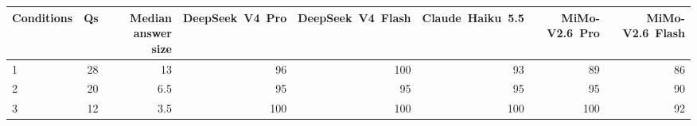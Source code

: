\begin{tabular}{lrrrrrrr}
\toprule
Conditions & Qs & Median answer size & DeepSeek\ V4\ Pro & DeepSeek\ V4\ Flash & Claude\ Haiku\ 5.5 & MiMo-V2.6\ Pro & MiMo-V2.6\ Flash \\
\midrule
1 & 28 & 13 & 96 & 100 & 93 & 89 & 86 \\
2 & 20 & 6.5 & 95 & 95 & 95 & 95 & 90 \\
3 & 12 & 3.5 & 100 & 100 & 100 & 100 & 92 \\
\bottomrule
\end{tabular}
